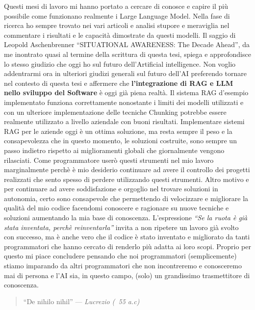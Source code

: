 \documentclass[12pt,a4paper,openright,twoside]{book}
\begin{document}
Questi mesi di lavoro mi hanno portato a cercare di conosce e capire il più possibile come funzionano realmente i Large Language Model.
Nella fase di ricerca ho sempre trovato nei vari articoli e analisi stupore e meraviglia nel commentare i risultati e le capacità dimostrate da questi modelli.
Il saggio di Leopold Aschenbrenner \cite{Aschenbrenner2024} ``SITUATIONAL AWARENESS: The Decade Ahead'', da me inontrato quasi al termine della scrittura di questa tesi, spiega e approfondisce lo stesso giudizio che oggi ho sul futuro dell'Artificial intelligence.
Non voglio addentrarmi ora in ulteriori giudizi generali sul futuro dell'AI preferendo tornare nel contesto di questa tesi e affermere che \textbf{l'integrazione di RAG e LLM nello sviluppo del Software} è oggi già piena realtà.
Il sistema RAG d'esempio implementato funziona correttamente nonostante i limiti dei modelli utilizzati e con un ulteriore implementazione delle tecniche Chunking potrebbe essere realmente utilizzato a livello aziendale con buoni risultati.
Implementare sistemi RAG per le aziende oggi è un ottima soluzione,
ma resta sempre il peso e la consapevolezza che in questo momento, le soluzioni costruite, sono sempre un passo indietro rispetto ai miglioramenti globali che
giornalmente vengono rilasciati.
Come programmatore userò questi strumenti nel mio lavoro marginalmente perchè è mio desiderio continuare ad avere il controllo dei progetti realizzati che sento spesso di perdere utilizzando questi strumenti.
Altro motivo e per continuare ad avere soddisfazione e orgoglio nel trovare soluzioni in autonomia, 
certo sono consapevole che permettendo di velocizzare e migliorare la qualità del mio codice facendomi
conoscere e ragionare su nuove tecniche e soluzioni aumentando la mia base di conoscenza.
L'espressione \emph{``Se la ruota è già stata inventata, perchè reinventarla''} invita a non ripetere un lavoro già svolto con successo,
ma è anche vero che il codice è stato inventato e migliorato da tanti programmatori che hanno cercato di renderlo più adatta ai loro scopi.
Proprio per questo mi piace concludere pensando che noi programmatori (semplicemente) stiamo imparando da altri programmatori che non incontreremo e conosceremo mai di persona e l'AI sia, in questo campo, (solo) un grandissimo trasmettitore di conoscenza.

\begin{quote}
    “De nihilo nihil”
    \hfill--- \textit{Lucrezio (~55 a.c) }
\end{quote}
\end{document}
